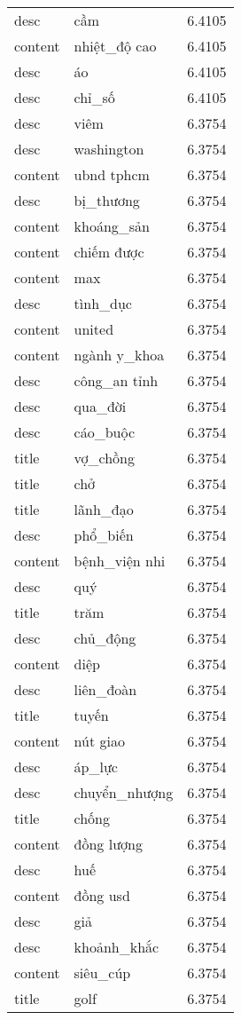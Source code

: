 \documentclass{article}
\begin{document}
\begin{tabular}{lll}
desc & cầm & 6.4105\\
content & nhiệt\_độ cao & 6.4105\\
desc & áo & 6.4105\\
desc & chỉ\_số & 6.4105\\
desc & viêm & 6.3754\\
desc & washington & 6.3754\\
content & ubnd tphcm & 6.3754\\
desc & bị\_thương & 6.3754\\
content & khoáng\_sản & 6.3754\\
content & chiếm được & 6.3754\\
content & max & 6.3754\\
desc & tình\_dục & 6.3754\\
content & united & 6.3754\\
content & ngành y\_khoa & 6.3754\\
desc & công\_an tỉnh & 6.3754\\
desc & qua\_đời & 6.3754\\
desc & cáo\_buộc & 6.3754\\
title & vợ\_chồng & 6.3754\\
title & chở & 6.3754\\
title & lãnh\_đạo & 6.3754\\
desc & phổ\_biến & 6.3754\\
content & bệnh\_viện nhi & 6.3754\\
desc & quý & 6.3754\\
title & trăm & 6.3754\\
desc & chủ\_động & 6.3754\\
content & diệp & 6.3754\\
desc & liên\_đoàn & 6.3754\\
title & tuyến & 6.3754\\
content & nút giao & 6.3754\\
desc & áp\_lực & 6.3754\\
desc & chuyển\_nhượng & 6.3754\\
title & chống & 6.3754\\
content & đồng lượng & 6.3754\\
desc & huế & 6.3754\\
content & đồng usd & 6.3754\\
desc & giả & 6.3754\\
desc & khoảnh\_khắc & 6.3754\\
content & siêu\_cúp & 6.3754\\
title & golf & 6.3754\\

\end{tabular}
\end{document}
